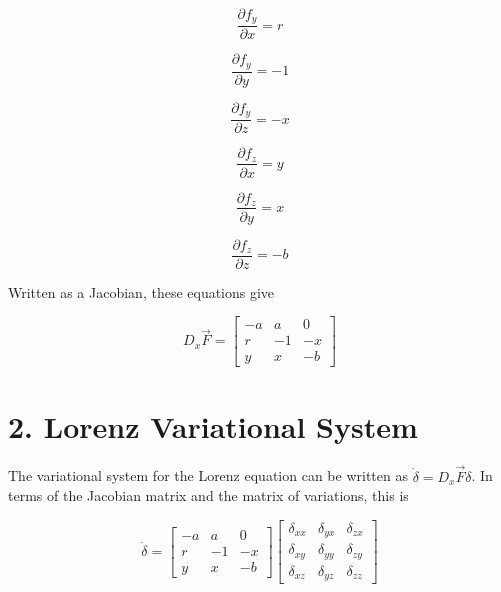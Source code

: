 \documentclass[12pt, letterpaper]{article}
\begin{document}
\begin{equation}
\frac{\partial f_y}{\partial x} = r
\end{equation}

\begin{equation}
\frac{\partial f_y}{\partial y} = -1
\end{equation}

\begin{equation}
\frac{\partial f_y}{\partial z} = -x
\end{equation}

\begin{equation}
\frac{\partial f_z}{\partial x} = y
\end{equation}

\begin{equation}
\frac{\partial f_z}{\partial y} = x
\end{equation}

\begin{equation}
\frac{\partial f_z}{\partial z} = -b
\end{equation}

Written as a Jacobian, these equations give

\begin{equation}
D_x\vec{F} = \left[ \begin{array}{ccc}
-a & a & 0 \\
r & -1 & -x \\
y & x & -b 
\end{array} \right]
\end{equation}

\section*{2. Lorenz Variational System}

The variational system for the Lorenz equation can be written as $\dot{\delta}
= D_x\vec{F}\delta$. In terms of the Jacobian matrix and the matrix of variations,
this is

\begin{equation}
\dot{\delta} = \left[ \begin{array}{ccc}
-a & a & 0 \\
r & -1 & -x \\
y & x & -b
\end{array} \right] \left[ \begin{array}{ccc}
\delta_{xx} & \delta_{yx} & \delta_{zx} \\
\delta_{xy} & \delta_{yy} & \delta_{zy} \\
\delta_{xz} & \delta_{yz} & \delta_{zz} 
\end{array} \right]
\end{equation}
\end{document}
